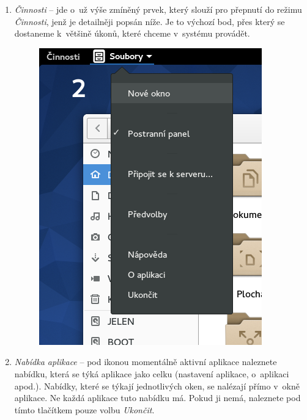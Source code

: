 \begin{enumerate}
\item\emph{Činnosti} -- jde o~už výše zmíněný prvek, který slouží pro přepnutí do režimu \emph{Činnosti}, jenž je detailněji popsán níže. Je to výchozí bod, přes který se dostaneme k~většině úkonů, které chceme v~systému provádět.

\begin{figure}[t]
\begin{center}
\includegraphics[width=\textwidth]{img/menu-aplikace}
 \label{fig:menu-aplikace}
\end{center}
\end{figure}

\item\emph{Nabídka aplikace} -- pod ikonou momentálně aktivní aplikace naleznete nabídku, která se týká aplikace jako celku (nastavení aplikace, o~aplikaci apod.). Nabídky, které se týkají jednotlivých oken, se nalézají přímo v~okně aplikace. Ne každá aplikace tuto nabídku má. Pokud ji nemá, naleznete pod tímto tlačítkem pouze volbu \emph{Ukončit}.



\end{enumerate}
